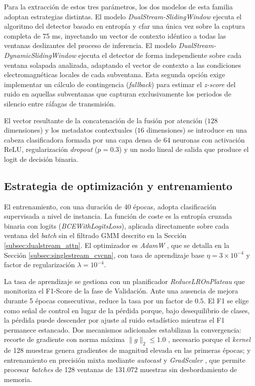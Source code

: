 Para la extracción de estos tres parámetros, los dos modelos de esta familia adoptan estrategias distintas. El modelo \textit{DualStream-SlidingWindow} ejecuta el algoritmo del detector basado en entropía y \gls{cfar} una única vez sobre la captura completa de 75 ms, inyectando un vector de contexto idéntico a todas las ventanas deslizantes del proceso de inferencia. El modelo \textit{DualStream-DynamicSlidingWindow} ejecuta el detector de forma independiente sobre cada ventana solapada analizada, adaptando el vector de contexto a las condiciones electromagnéticas locales de cada subventana. Esta segunda opción exige implementar un cálculo de contingencia (\textit{fallback}) para estimar el \textit{z-score} del ruido en aquellas subventanas que capturan exclusivamente los periodos de silencio entre ráfagas de transmisión.

El vector resultante de la concatenación de la fusión por atención ($128$ dimensiones) y los metadatos contextuales ($16$ dimensiones) se introduce en una cabeza clasificadora formada por una capa densa de $64$ neuronas con activación ReLU, regularización \textit{dropout} ($p=0.3$) y un nodo lineal de salida que produce el logit de decisión binaria.

\subsection{Estrategia de optimización y entrenamiento}
El entrenamiento, con una duración de 40 épocas, adopta clasificación supervisada a nivel de instancia. La función de coste es la entropía cruzada binaria con logits (\textit{BCEWithLogitsLoss}), aplicada directamente sobre cada ventana del \textit{batch} sin el filtrado GMM descrito en la Sección \ref{subsec:dualstream_attn}. El optimizador es \textit{AdamW} \cite{loshchilov_decoupled_2019}, que se detalla en la Sección \ref{subsec:singlestream_cvcnn}, con tasa de aprendizaje base $\eta = 3\times10^{-4}$ y factor de regularización $\lambda = 10^{-4}$.

La tasa de aprendizaje se gestiona con un planificador \textit{ReduceLROnPlateau} que monitoriza el F1-Score de la fase de Validación. Ante una ausencia de mejora durante 5 épocas consecutivas, reduce la tasa por un factor de $0.5$. El F1 se elige como señal de control en lugar de la pérdida porque, bajo desequilibrio de clases, la pérdida puede descender por ajuste al ruido estadístico mientras el F1 permanece estancado. Dos mecanismos adicionales estabilizan la convergencia: recorte de gradiente con norma máxima $\|g\|_2 \leq 1.0$ \cite{pascanu_difficulty_2013}, necesario porque el \textit{kernel} de 128 muestras genera gradientes de magnitud elevada en las primeras épocas; y entrenamiento en precisión mixta mediante \textit{autocast} y \textit{GradScaler} \cite{micikevicius_mixed_2018}, que permite procesar \textit{batches} de 128 ventanas de 131.072 muestras sin desbordamiento de memoria.

